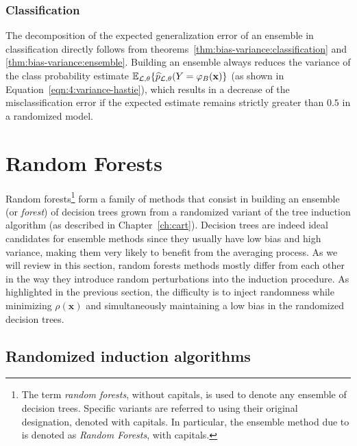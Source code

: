 \subsubsection{Classification}

The decomposition of the expected generalization error of an ensemble in
classification directly follows from theorems~\ref{thm:bias-variance:classification} and
\ref{thm:bias-variance:ensemble}.
Building an ensemble always reduces the variance of the class probability estimate
$\mathbb{E}_{{\cal L},\theta}\{ \widehat{p}_{{\cal
L},\theta}(Y=\varphi_B(\mathbf{x}) \}$ (as shown in Equation~\ref{eqn:4:variance-hastie}), which results in a decrease of the misclassification error
if the expected estimate remains strictly greater than $0.5$ in a
randomized model.


\section{Random Forests}
\label{sec:4:random-forests}

Random forests\footnote{The term
\textit{random forests}, without capitals, is used to denote any ensemble of decision
trees. Specific variants are referred to using their original designation,
denoted with capitals. In particular, the ensemble method due to
\citet{breiman:2001} is denoted as \textit{Random Forests}, with capitals.}
form a family of methods that consist in building an ensemble (or
\textit{forest}) of decision trees grown from a randomized variant of the tree
induction algorithm (as described in Chapter~\ref{ch:cart}). Decision trees are
indeed ideal candidates for ensemble methods since they usually have low bias
and high variance, making them very likely to benefit from the averaging
process. As we will review in this section, random forests methods mostly
differ from each other in the way they introduce random perturbations into the
induction procedure. As highlighted in the previous section, the difficulty is
to inject randomness while minimizing $\rho(\mathbf{x})$ and
simultaneously maintaining a low bias in the randomized decision trees.

\subsection{Randomized induction algorithms}

